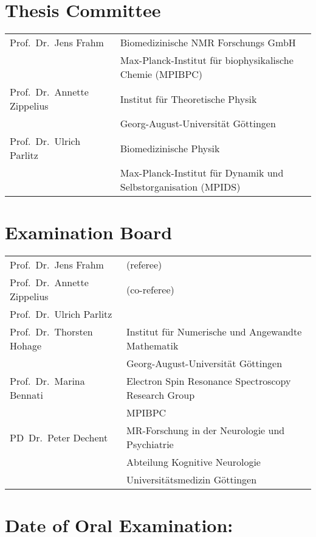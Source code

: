 {
\vspace*{\fill}

\section*{Thesis Committee}
\begin{flushleft}
\begin{tabular}{p{}p{}}
  Prof.~Dr.~Jens Frahm        & Biomedizinische NMR Forschungs GmbH \\
                              & Max-Planck-Institut f\"{u}r biophysikalische Chemie (MPIBPC) \\
  Prof.~Dr.~Annette Zippelius & Institut f\"{u}r Theoretische Physik \\
                              & Georg-August-Universit\"{a}t G\"{o}ttingen \\
  Prof.~Dr.~Ulrich Parlitz    & Biomedizinische Physik \\
                              & Max-Planck-Institut f\"{u}r Dynamik und Selbstorganisation (MPIDS) \\
\end{tabular}
\end{flushleft}


\section*{Examination Board}
\begin{flushleft}
\begin{tabular}{p{}p{}}
  Prof.~Dr.~Jens Frahm        & (referee) \\
  Prof.~Dr.~Annette Zippelius & (co-referee) \\
  Prof.~Dr.~Ulrich Parlitz    & \\
  Prof.~Dr.~Thorsten Hohage   & Institut f\"{u}r Numerische und Angewandte Mathematik \\
                              & Georg-August-Universit\"{a}t G\"{o}ttingen \\
  Prof.~Dr.~Marina Bennati    & Electron Spin Resonance Spectroscopy Research Group \\
                              & MPIBPC \\
  PD~Dr.~Peter Dechent        & MR-Forschung in der Neurologie und Psychiatrie \\
                              & Abteilung Kognitive Neurologie \\
                              & Universit\"{a}tsmedizin G\"{o}ttingen \\
\end{tabular}
\end{flushleft}


\section*{Date of Oral Examination:}


}

\thispagestyle{empty}
\clearpage
